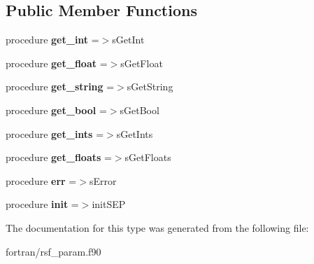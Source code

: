 \subsection*{Public Member Functions}
\begin{DoxyCompactItemize}
\item 
\mbox{\label{structrsf__param__mod_1_1rsfparam_a29365836966f2c5884feadb8c860b9ba}} 
procedure {\bfseries get\+\_\+int} =$>$s\+Get\+Int
\item 
\mbox{\label{structrsf__param__mod_1_1rsfparam_a8a1f0dd02ca9b1fa020c820c92409dfb}} 
procedure {\bfseries get\+\_\+float} =$>$s\+Get\+Float
\item 
\mbox{\label{structrsf__param__mod_1_1rsfparam_a0992190aa54c373ad452436e4b5b63e6}} 
procedure {\bfseries get\+\_\+string} =$>$s\+Get\+String
\item 
\mbox{\label{structrsf__param__mod_1_1rsfparam_a19e38213b9fc0712e1a3c14da1226643}} 
procedure {\bfseries get\+\_\+bool} =$>$s\+Get\+Bool
\item 
\mbox{\label{structrsf__param__mod_1_1rsfparam_a643723a7c326b006eb6f60f60c14be5f}} 
procedure {\bfseries get\+\_\+ints} =$>$s\+Get\+Ints
\item 
\mbox{\label{structrsf__param__mod_1_1rsfparam_afa4011fef94435a2154bcbf39477f68c}} 
procedure {\bfseries get\+\_\+floats} =$>$s\+Get\+Floats
\item 
\mbox{\label{structrsf__param__mod_1_1rsfparam_ac2f12f66e8ea0f3b6e1e960135a8b98b}} 
procedure {\bfseries err} =$>$s\+Error
\item 
\mbox{\label{structrsf__param__mod_1_1rsfparam_aa77e3760d2c92b4c24f6d475014fa9af}} 
procedure {\bfseries init} =$>$init\+S\+EP
\end{DoxyCompactItemize}


The documentation for this type was generated from the following file\+:\begin{DoxyCompactItemize}
\item 
fortran/rsf\+\_\+param.\+f90\end{DoxyCompactItemize}
